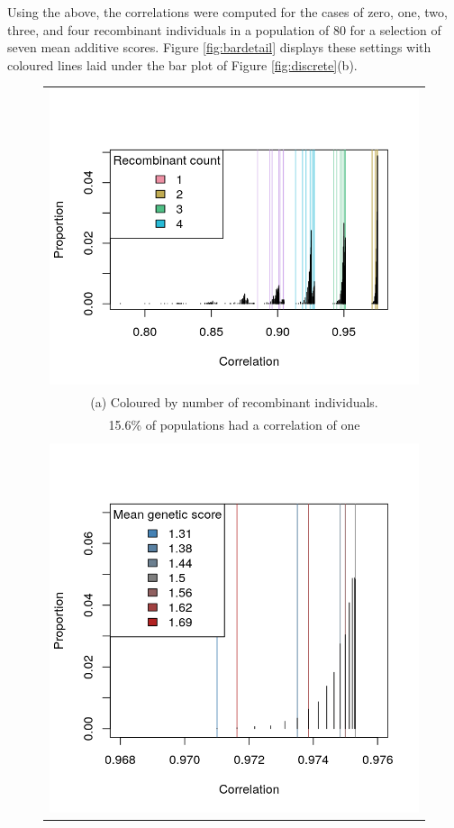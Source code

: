 \documentclass[sts]{imsart}
\begin{document}
Using the above, the correlations were computed for the cases of zero, one, two, three, and four recombinant individuals in a population of 80 for a selection of seven mean additive scores. Figure \ref{fig:bardetail} displays these settings with coloured lines laid under the bar plot of Figure \ref{fig:discrete}(b).
\begin{figure}[htp]
  \begin{center}
    \begin{tabular}{c}
      \includegraphics[scale = 0.6]{../img/strngBarLndscp.png} \\ %
      {\footnotesize (a) Coloured by number of recombinant individuals.} \\
      {\footnotesize 15.6\% of populations had a correlation of one} \\
      \\
      \includegraphics[scale = 0.6]{../img/strngBarClose.png} \\

\end{tabular}
\end{center}
\end{figure}
\end{document}
